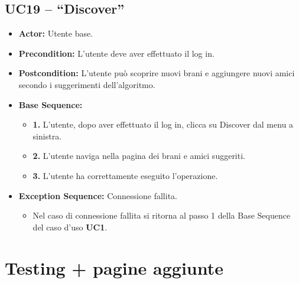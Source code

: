 \subsection{UC19 -- ``Discover''}
\begin{itemize}
    \item \textbf{Actor:} Utente base.
    \item \textbf{Precondition:} L'utente deve aver effettuato il log in.
    \item \textbf{Postcondition:} L'utente può scoprire nuovi brani e aggiungere nuovi amici secondo i suggerimenti dell'algoritmo. 
    \item \textbf{Base Sequence:}
    \begin{itemize}
        \item \textbf{1.} L'utente, dopo aver effettuato il log in, clicca su Discover dal menu a sinistra.
        \item \textbf{2.} L'utente naviga nella pagina dei brani e amici suggeriti.
        \item \textbf{3.} L'utente ha correttamente eseguito l'operazione.
    \end{itemize}
    \item \textbf{Exception Sequence:} Connessione fallita.
    \begin{itemize}
        \item Nel caso di connessione fallita si ritorna al passo 1 della Base Sequence del caso d'uso \textbf{UC1}.
    \end{itemize}
\end{itemize}
\vspace{1cm}


\section{Testing + pagine aggiunte}